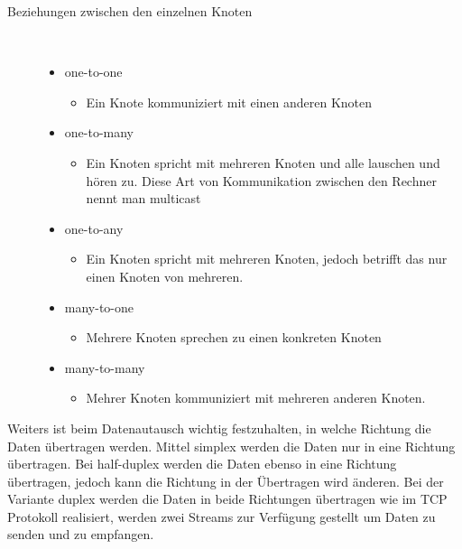 \documentclass[a4paper,12pt]{article}
\begin{document}
\begin{description}
    \item[Beziehungen zwischen den einzelnen Knoten] ~\par
    \begin{itemize}
        \item one-to-one
        \begin{itemize}
            \item{Ein Knote kommuniziert mit einen anderen Knoten}
        \end{itemize}
        \item one-to-many
        \begin{itemize}
            \item{Ein Knoten spricht mit mehreren Knoten und alle lauschen und hören zu. Diese Art von Kommunikation zwischen den Rechner nennt man multicast}
        \end{itemize}
        \item one-to-any
        \begin{itemize}
            \item{Ein Knoten spricht mit mehreren Knoten, jedoch betrifft das nur einen Knoten von mehreren.}
        \end{itemize}
        \item many-to-one
        \begin{itemize}
            \item{Mehrere Knoten sprechen zu einen konkreten Knoten}
        \end{itemize}
        \item many-to-many
        \begin{itemize}
            \item{Mehrer Knoten kommuniziert mit mehreren anderen Knoten.\\}
        \end{itemize}
    \end{itemize} 
\end{description}
Weiters ist beim Datenautausch wichtig festzuhalten, in welche Richtung die Daten übertragen werden. Mittel simplex werden die Daten nur in eine Richtung übertragen. 
Bei half-duplex werden die Daten ebenso in eine Richtung übertragen, jedoch kann die Richtung in der Übertragen wird änderen. Bei der Variante duplex werden die Daten in beide Richtungen übertragen wie im TCP Protokoll realisiert, werden zwei Streams
zur Verfügung gestellt um Daten zu senden und zu empfangen.\\\\\\\\
\end{document}
